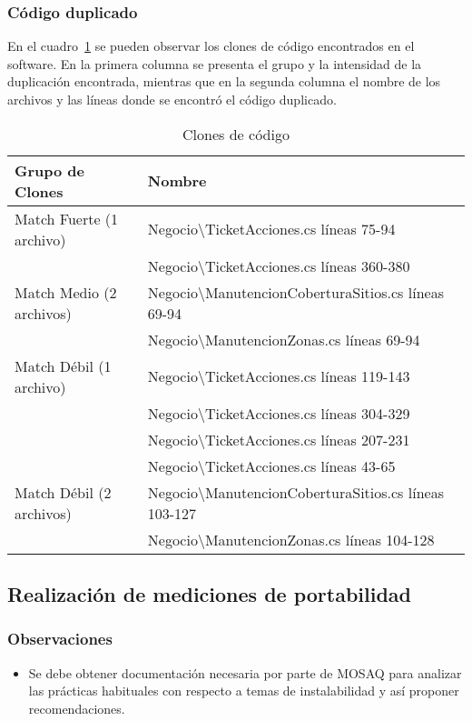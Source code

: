 \subsubsection{Código duplicado}

En el cuadro~\ref{table:clones} se pueden observar los clones de código
encontrados en el software. En la primera columna se presenta el grupo y la
intensidad de la duplicación encontrada, mientras que en la segunda columna el
nombre de los archivos y las líneas donde se encontró el código duplicado.

\begin{table}
    \small
\centering

  \begin{tabular}{ | l | l | }
  
  \hline
    \bf{Grupo de Clones} & \bf{Nombre} \\ \hline
    Match Fuerte (1 archivo) & Negocio\textbackslash TicketAcciones.cs líneas 75-94 \\ \hline
     & Negocio\textbackslash TicketAcciones.cs líneas 360-380 \\ \hline
    Match Medio (2 archivos) & Negocio\textbackslash ManutencionCoberturaSitios.cs líneas 69-94 \\ \hline
     & Negocio\textbackslash ManutencionZonas.cs líneas 69-94 \\ \hline
    Match Débil (1 archivo) & Negocio\textbackslash TicketAcciones.cs líneas 119-143 \\ \hline
     & Negocio\textbackslash TicketAcciones.cs líneas 304-329 \\ \hline
     & Negocio\textbackslash TicketAcciones.cs líneas 207-231 \\ \hline
     & Negocio\textbackslash TicketAcciones.cs líneas 43-65 \\ \hline
    Match Débil (2 archivos) & Negocio\textbackslash ManutencionCoberturaSitios.cs líneas 103-127 \\ \hline
     & Negocio\textbackslash ManutencionZonas.cs líneas 104-128 \\ \hline
  \end{tabular}
  \caption{Clones de código}
  \label{table:clones}
\end{table}

\subsection{Realización de mediciones de portabilidad}

\subsubsection{Observaciones}
\begin{itemize}
\item Se debe obtener documentación necesaria por parte de MOSAQ para analizar
las prácticas habituales con respecto a temas de instalabilidad y así proponer recomendaciones.
\end{itemize}

